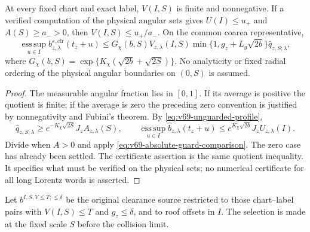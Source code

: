 \begin{lemma}
\label{lem:v69-finite-scale-certificate}
At every fixed chart and exact label, $V(I,S)$ is finite and
nonnegative. If a verified computation of the physical angular sets
gives $U(I)\le u_+$ and $A(S)\ge a_->0$, then
$V(I,S)\le u_+/a_-$. On the common coarea representative,
\begin{equation}\label{eq:v69-finite-scale-comparison}
 \operatorname*{ess\,sup}_{u\in I}
 b_{z,\lambda}^{\varepsilon,\mathrm{clr}}(t_z+u)
 \le G_\chi(b,S)V_{z,\lambda}(I,S)
       \min\{1,g_z+L_g\sqrt{2b}\}\widehat q_{z,S;\lambda},
\end{equation}
where
$G_\chi(b,S)=\exp\{K_\chi(\sqrt{2b}+\sqrt{2S})\}$.
No analyticity or fixed radial ordering of the physical angular
boundaries on $(0,S)$ is assumed.
\end{lemma}
\begin{proof}
The measurable angular fraction lies in $[0,1]$. If its average is
positive the quotient is finite; if the average is zero the preceding
zero convention is justified by nonnegativity and Fubini's theorem.
By \eqref{eq:v69-unguarded-profile},
\[
 \widehat q_{z,S;\lambda}\ge
          e^{-K_\chi\sqrt{2S}}J_z A_{z,\lambda}(S),\qquad
 \operatorname*{ess\,sup}_{u\in I}\widehat b_{z,\lambda}(t_z+u)
       \le e^{K_\chi\sqrt{2b}}J_z U_{z,\lambda}(I).
\]
Divide when $A>0$ and apply
\eqref{eq:v69-absolute-guard-comparison}. The zero case has already
been settled. The certificate assertion is the same quotient
inequality. It specifies what must be verified on the physical
sets; no numerical certificate for all long Lorentz words is asserted.
\end{proof}

Let $b^{I,S,V\le T;\le\delta}$ be the original clearance source
restricted to those chart--label pairs with $V(I,S)\le T$ and
$g_z\le\delta$, and to roof offsets in $I$. The selection is made
at the fixed scale $S$ before the collision limit.

